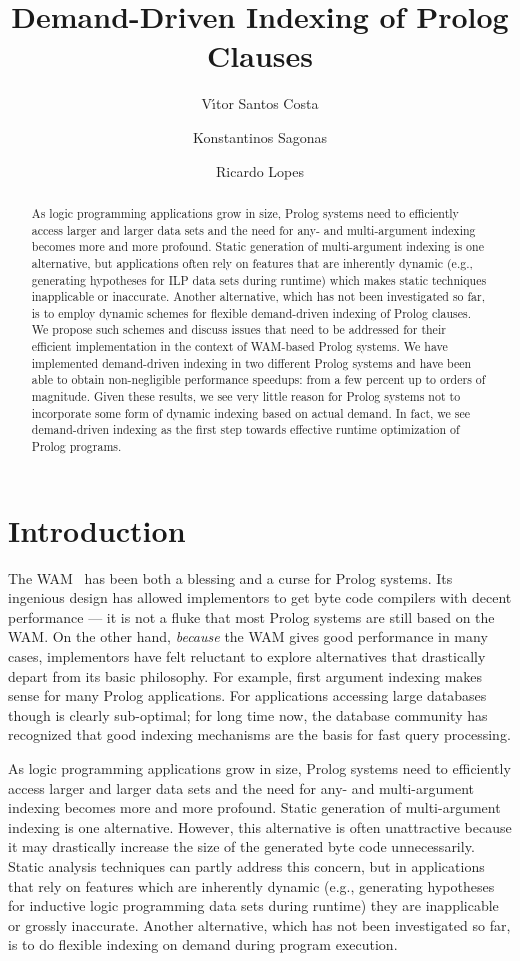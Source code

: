 \documentclass{llncs}
\title{Demand-Driven Indexing of Prolog Clauses}
\author{V\'{\i}tor Santos Costa\inst{1} \and Konstantinos
  Sagonas\inst{2} \and Ricardo Lopes\inst{1}}
\institute{
  University of Porto, Portugal
  \and
  National Technical University of Athens, Greece
}
\begin{document}
\maketitle

\begin{abstract}
  As logic programming applications grow in size, Prolog systems need
  to efficiently access larger and larger data sets and the need for
  any- and multi-argument indexing becomes more and more profound.
  Static generation of multi-argument indexing is one alternative, but
  applications often rely on features that are inherently dynamic
  (e.g., generating hypotheses for ILP data sets during runtime) which
  makes static techniques inapplicable or inaccurate. Another
  alternative, which has not been investigated so far, is to employ
  dynamic schemes for flexible demand-driven indexing of Prolog
  clauses. We propose such schemes and discuss issues that need to be
  addressed for their efficient implementation in the context of
  WAM-based Prolog systems. We have implemented demand-driven indexing
  in two different Prolog systems and have been able to obtain
  non-negligible performance speedups: from a few percent up to orders
  of magnitude. Given these results, we see very little reason for
  Prolog systems not to incorporate some form of dynamic indexing
  based on actual demand. In fact, we see demand-driven indexing as
  the first step towards effective runtime optimization of Prolog
  programs.
\end{abstract}


\section{Introduction}
The WAM~\cite{Warren83} has been both a blessing and a curse for
Prolog systems. Its ingenious design has allowed implementors to get
byte code compilers with decent performance --- it is not a fluke that
most Prolog systems are still based on the WAM. On the other hand,
\emph{because} the WAM gives good performance in many cases,
implementors have felt reluctant to explore alternatives that
drastically depart from its basic philosophy.
%
For example, first argument indexing makes sense for many Prolog
applications. For applications accessing large databases though is
clearly sub-optimal; for long time now, the database community has
recognized that good indexing mechanisms are the basis for fast query
processing.

As logic programming applications grow in size, Prolog systems need to
efficiently access larger and larger data sets and the need for any-
and multi-argument indexing becomes more and more profound. Static
generation of multi-argument indexing is one alternative. However,
this alternative is often unattractive because it may drastically
increase the size of the generated byte code unnecessarily. Static
analysis techniques can partly address this concern, but in
applications that rely on features which are inherently dynamic (e.g.,
generating hypotheses for inductive logic programming data sets during
runtime) they are inapplicable or grossly inaccurate. Another
alternative, which has not been investigated so far, is to do flexible
indexing on demand during program execution.
\end{document}
